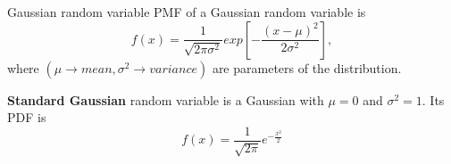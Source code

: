 \begin{fact}{Gaussian random variable}{}
  PMF of a Gaussian random variable is
  \begin{equation*}
    f(x)=\frac{1}{\sqrt{2\pi\sigma^2}}exp\left[-\frac{(x-\mu)^2}{2\sigma^2}\right],
  \end{equation*}
  where $(\mu\rightarrow mean,\sigma^2\rightarrow variance)$ are parameters of the distribution.

  \textbf{Standard Gaussian} random variable is a Gaussian with $\mu=0$ and $\sigma^2=1$. Its PDF is
  \begin{equation*}
    f(x)=\frac{1}{\sqrt{2\pi}}e^{-\frac{x^2}{2}}
  \end{equation*}
\end{fact}
